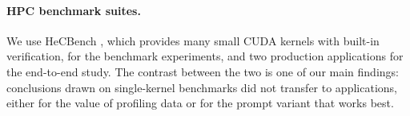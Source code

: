 \paragraph{HPC benchmark suites.}
We use HeCBench \cite{jin2023hecbench}, which provides many small CUDA kernels with built-in
verification, for the benchmark experiments, and two production applications for the end-to-end study.
The contrast between the two is one of our main findings: conclusions drawn on single-kernel
benchmarks did not transfer to applications, either for the value of profiling data or for the prompt
variant that works best.
